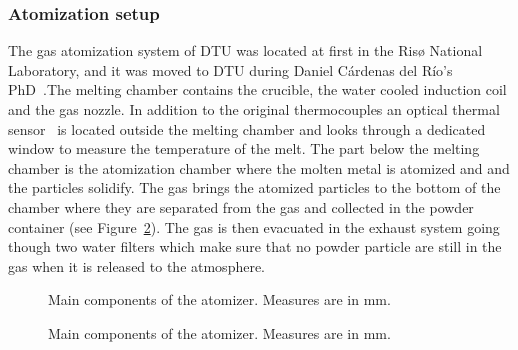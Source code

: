 \documentclass[../../main.tex]{subfiles}
\begin{document}
\subsubsection{Atomization setup}

The gas atomization system of DTU was located at first in the Risø National Laboratory, and it was moved to DTU during Daniel Cárdenas del Río's PhD~\cite{CardenasdelRio2023DesignMetallic}.The melting chamber contains the crucible, the water cooled induction coil and the gas nozzle. In addition to the original thermocouples an optical thermal sensor~\cite{RaytekMarathon} is located outside the melting chamber and looks through a dedicated window to measure the temperature of the melt. The part below the melting chamber is the atomization chamber where the molten metal is atomized and and the particles solidify. The gas brings the atomized particles to the bottom of the chamber where they are separated from the gas and collected in the powder container (see Figure~\ref{atomizer}). The gas is then evacuated in the exhaust system going though two water filters which make sure that no powder particle are still in the gas when it is released to the atmosphere.


\vspace{0mm}
\begin{figure}[H]
    \centering
        
        \caption{Main components of the atomizer. Measures are in mm.}
        \label{atomizer}
\end{figure}
\FloatBarrier
\vspace{0mm}

\vspace{0mm}
\begin{figure}[H]
    \centering
        
        \caption{Main components of the atomizer. Measures are in mm.}
        \label{atomizer}
\end{figure}
\FloatBarrier
\vspace{0mm}
\end{document}
